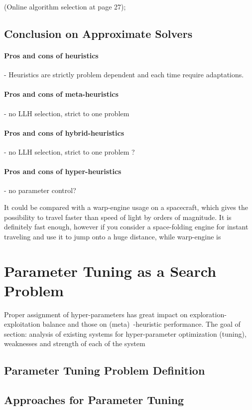 \cite{drake2019recent} (Online algorithm selection at page 27); \cite{kerschke2019automated}

\subsection{Conclusion on Approximate Solvers}
\paragraph{Pros and cons of heuristics} - Heuristics are strictly problem dependent and each time require adaptations.
\paragraph{Pros and cons of meta-heuristics} - no LLH selection, strict to one problem
\paragraph{Pros and cons of hybrid-heuristics} - no LLH selection, strict to one problem ? 
\paragraph{Pros and cons of hyper-heuristics} - no parameter control?



It could be compared with a warp-engine usage on a spacecraft, which gives the possibility to travel faster than speed of light by orders of magnitude. It is definitely fast enough, however if you consider a space-folding engine for instant traveling and use it to jump onto a huge distance, while warp-engine is 


\section{Parameter Tuning as a Search Problem}\label{bg: parameter tuning}
Proper assignment of hyper-parameters has great impact on exploration-exploitation balance and those on (meta)~-heuristic performance. 
The goal of section: analysis of existing systems for hyper-parameter optimization (tuning), weaknesses and strength of each of the system

\subsection{Parameter Tuning Problem Definition}
\subsection{Approaches for Parameter Tuning}

